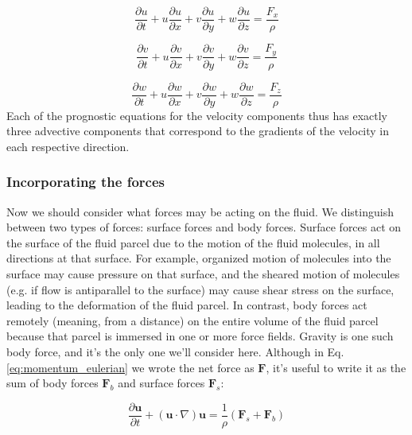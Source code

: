 \documentclass[12pt]{article}
\numberwithin{equation}{section}
\numberwithin{figure}{section}
\numberwithin{table}{section}
\begin{document}
\begin{equation}
  \frac{\partial u}{\partial t} + u \frac{\partial u}{\partial x} + v \frac{\partial u}{\partial y} + w \frac{\partial u}{\partial z} = \frac{F_x}{\rho}
\end{equation}

\begin{equation}
  \frac{\partial v}{\partial t} + u \frac{\partial v}{\partial x} + v \frac{\partial v}{\partial y} + w \frac{\partial v}{\partial z} = \frac{F_y}{\rho}
\end{equation}

\begin{equation}
  \frac{\partial w}{\partial t} + u \frac{\partial w}{\partial x} + v \frac{\partial w}{\partial y} + w \frac{\partial w}{\partial z} = \frac{F_z}{\rho}
\end{equation}
Each of the prognostic equations for the velocity components thus has exactly
three advective components that correspond to the gradients of the velocity
in each respective direction.

\subsubsection{Incorporating the forces}

Now we should consider what forces may be acting on the fluid.
We distinguish between two types of forces: surface forces and body forces.
Surface forces act on the surface of the fluid parcel due to the motion of the
fluid molecules, in all directions at that surface.
For example, organized motion of molecules into the surface may cause pressure
on that surface, and the sheared motion of molecules (e.g. if flow is
antiparallel to the surface) may cause shear stress on the surface, leading to
the deformation of the fluid parcel.
In contrast, body forces act remotely (meaning, from a distance) on the entire
volume of the fluid parcel because that parcel is immersed in one or more force fields.
Gravity is one such body force, and it's the only one we'll consider here.
Although in Eq. \ref{eq:momentum_eulerian} we wrote the net force as $\mathbf{F}$,
it's useful to write it as the sum of body forces $\mathbf{F}_b$ and surface
forces $\mathbf{F}_s$:

\begin{equation}
  \frac{\partial \mathbf{u}}{\partial t} + (\mathbf{u} \cdot \nabla) \mathbf{u} = \frac{1}{\rho} (\mathbf{F}_s + \mathbf{F}_b)
\end{equation}
\end{document}
